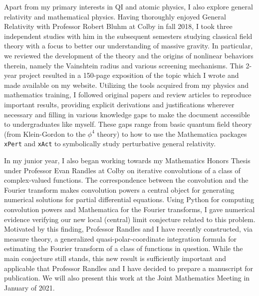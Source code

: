 \documentclass[12pt]{article}
\begin{document}
Apart from my primary interests in QI and atomic physics, I also explore general relativity and mathematical physics. Having thoroughly enjoyed General Relativity with Professor Robert Bluhm at Colby in fall 2018, I took three independent studies with him in the subsequent semesters studying classical field theory with a focus to better our understanding of massive gravity. In particular, we reviewed the development of the theory and the origins of nonlinear behaviors therein, namely the Vainshtein radius and various screening mechanisms. This 2-year project resulted in a 150-page exposition of the topic which I wrote and made available on my website. Utilizing the tools acquired from my physics and mathematics training, I followed original papers and review articles to reproduce important results, providing explicit derivations and justifications wherever necessary and filling in various knowledge gaps to make the document accessible to undergraduates like myself. These gaps range from basic quantum field theory (from Klein-Gordon to the $\phi^4$ theory) to how to use the Mathematica packages \texttt{xPert} and \texttt{xAct} to symbolically study perturbative general relativity. \\ \vspace{-9pt}

In my junior year, I also began working towards my Mathematics Honors Thesis under Professor Evan Randles at Colby on iterative convolutions of a class of complex-valued functions. The correspondence between the convolution and the Fourier transform makes convolution powers a central object for generating numerical solutions for partial differential equations. Using Python for computing convolution powers and Mathematica for the Fourier transforms, I gave numerical evidence verifying our new local (central) limit conjecture related to this problem. Motivated by this finding, Professor Randles and I have recently constructed, via measure theory, a generalized quasi-polar-coordinate integration formula for estimating the Fourier transform of a class of functions in question. While the main conjecture still stands, this new result is sufficiently important and applicable that Professor Randles and I have decided to prepare a manuscript for publication. We will also present this work at the Joint Mathematics Meeting in January of 2021. \\ \vspace{-9pt}
\end{document}
